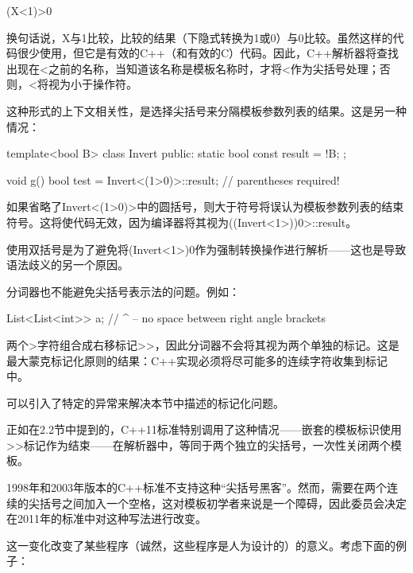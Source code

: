 \begin{cpp}
(X<1)>0
\end{cpp}

换句话说，X与1比较，比较的结果（下隐式转换为1或0）与0比较。虽然这样的代码很少使用，但它是有效的C++（和有效的C）代码。因此，C++解析器将查找出现在<之前的名称，当知道该名称是模板名称时，才将<作为尖括号处理；否则，<将视为小于操作符。

这种形式的上下文相关性，是选择尖括号来分隔模板参数列表的结果。这是另一种情况：

\begin{cpp}
template<bool B>
class Invert {
public:
	static bool const result = !B;
};

void g()
{
	bool test = Invert<(1>0)>::result; // parentheses required!
}
\end{cpp}

如果省略了Invert<(1>0)>中的圆括号，则大于符号将误认为模板参数列表的结束符号。这将使代码无效，因为编译器将其视为((Invert<1>))0>::result。

\begin{notice}
使用双括号是为了避免将(Invert<1>)0作为强制转换操作进行解析——这也是导致语法歧义的另一个原因。
\end{notice}

分词器也不能避免尖括号表示法的问题。例如：

\begin{cpp}
List<List<int>> a;
			 // ^ -- no space between right angle brackets
\end{cpp}

两个>字符组合成右移标记>{}>，因此分词器不会将其视为两个单独的标记。这是最大蒙克标记化原则的结果：C++实现必须将尽可能多的连续字符收集到标记中。

\begin{notice}
可以引入了特定的异常来解决本节中描述的标记化问题。
\end{notice}

正如在2.2节中提到的，C++11标准特别调用了这种情况——嵌套的模板标识使用>{}>标记作为结束——在解析器中，等同于两个独立的尖括号，一次性关闭两个模板。

\begin{notice}
1998年和2003年版本的C++标准不支持这种“尖括号黑客”。然而，需要在两个连续的尖括号之间加入一个空格，这对模板初学者来说是一个障碍，因此委员会决定在2011年的标准中对这种写法进行改变。
\end{notice}

这一变化改变了某些程序（诚然，这些程序是人为设计的）的意义。考虑下面的例子：

